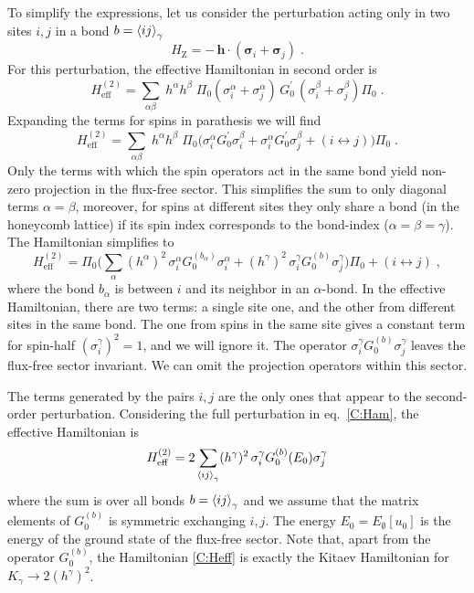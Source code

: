 To simplify the expressions, let us consider the perturbation acting only in two sites $i,j$ in a bond $b=\braket{ij}_\gamma$
\begin{equation}
    H_{\text{Z}} =
    - \, \mathbf{h}\cdot  (  \bm{\sigma}_i  +  \bm{\sigma}_j) \; .
\end{equation}
For this perturbation, the effective Hamiltonian in second order is
\begin{equation}
    H_{\text{eff}}^{(2)} = \sum_{\alpha\beta} \;
    h^\alpha h^\beta \; \Pi_0 ( \sigma_i^\alpha  +  \sigma_j^\alpha) \, G_0^{\prime} \,  ( \sigma_i^\beta  +  \sigma_j^\beta) \Pi_0 \; .
\end{equation}
Expanding the terms for spins in parathesis we will find
\begin{equation}
    H_{\text{eff}}^{(2)} = \sum_{\alpha\beta} \;
    h^\alpha h^\beta \; \Pi_0 \Big(
    \sigma_i^\alpha G_0^{\prime} \sigma_i^\beta+
    \sigma_i^\alpha G_0^{\prime} \sigma_j^\beta+  (i\leftrightarrow j)\Big)    \Pi_0 \; .
\end{equation}
Only the terms with which the spin operators act in the same bond yield non-zero projection in the flux-free sector.
This simplifies the sum to only diagonal terms $\alpha=\beta$, moreover, for spins at different sites they only share a bond (in the honeycomb lattice) if its spin index corresponds to the bond-index ($\alpha=\beta=\gamma$).
The Hamiltonian simplifies to
\begin{equation}
    H_{\text{eff}}^{(2)} =
    \Pi_0 \Big( \sum_\alpha  (h^\alpha)^2 \,
    \sigma_i^\alpha G_0^{(b_\alpha)} \sigma_i^\alpha+  (h^\gamma)^2 \, \sigma_i^\gamma G_0^{(b)} \sigma_j^\gamma  \Big)    \Pi_0  +(i\leftrightarrow j)\; ,
\end{equation}
where the bond $b_\alpha$ is between $i$ and its neighbor in an $\alpha$-bond. In the effective Hamiltonian, there are two terms:  a single site one, and the other from different sites in the same bond.
The one from spins in the same site gives a constant term for spin-half $(\sigma_i^\gamma)^2=1$, and we will ignore it.
The operator $\sigma_i^\gamma G_0^{(b)} \sigma_j^\gamma  $ leaves the flux-free sector invariant. We can omit the projection operators within this sector.


The terms generated by the pairs $i,j$ are the only ones that appear to the second-order perturbation.
Considering the full perturbation in eq.~\eqref{C:Ham}, the effective Hamiltonian is
\begin{equation}
    H_{\text{eff}}^{(2)} =
   2 \sum_{\braket{ij}_\gamma } (h^\gamma)^2 \, \sigma_i^\gamma G_0^{(b)}(E_0) \sigma_j^\gamma \label{C:Heff}
\end{equation}
where the sum is over all bonds $b=\braket{ij}_\gamma$ and we assume that the matrix elements of $G_0^{(b)}$ is symmetric exchanging $i,j$.
The energy $E_0=E_{\emptyset}[u_0]$ is the energy of the ground state of the flux-free sector.
Note that, apart from the operator $G_0^{(b)}$, the Hamiltonian
\eqref{C:Heff} is exactly the Kitaev Hamiltonian for $K_{\gamma}\to2(h^\gamma)^2$.

